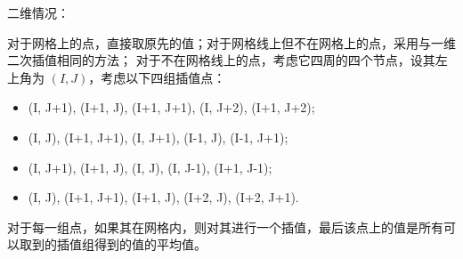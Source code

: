 \documentclass[lang=cn,a4paper,newtx,bibend=bibtex]{elegantpaper}
\begin{document}
二维情况：

对于网格上的点，直接取原先的值；对于网格线上但不在网格上的点，采用与一维二次插值相同的方法；
对于不在网格线上的点，考虑它四周的四个节点，设其左上角为 $(I, J)$，考虑以下四组插值点：
\begin{itemize}
  \item (I, J+1), (I+1, J), (I+1, J+1), (I, J+2), (I+1, J+2);
  \item (I, J), (I+1, J+1), (I, J+1), (I-1, J), (I-1, J+1);
  \item (I, J+1), (I+1, J), (I, J), (I, J-1), (I+1, J-1);
  \item (I, J), (I+1, J+1), (I+1, J), (I+2, J), (I+2, J+1).
\end{itemize}
对于每一组点，如果其在网格内，则对其进行一个插值，最后该点上的值是所有可以取到的插值组得到的值的平均值。
\end{document}
